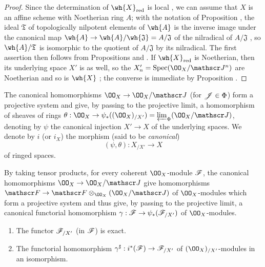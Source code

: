 \begin{proof}
\label{proof-1.10.8.6}
Since the determination of $\wh{X}_\red$ is local , we can assume that $X$ is an affine scheme with Noetherian ring $A$; with the notation of Proposition , the ideal $\mathfrak{T}$ of topologically nilpotent elements of $\wh{A}$ is the inverse image under the canonical map $\wh{A}\to\wh{A}/\wh{\mathfrak{J}}=A/\mathfrak{J}$ of the nilradical of $A/\mathfrak{J}$ , so $\wh{A}/\mathfrak{T}$ is isomorphic to the quotient of $A/\mathfrak{J}$ by its nilradical.
The first assertion then follows from Propositions  and .
If $\wh{X}_\red$ is Noetherian, then its underlying space $X'$ is as well, so the $X_n'=\Spec(\OO_X/\sh{J}^n)$ are Noetherian  and so is $\wh{X}$ ; the converse is immediate by Proposition .
\end{proof}

\begin{env}[10.8.7]
\label{1.10.8.7}
The canonical homomorphisms $\OO_X\to\OO_X/\sh{J}$ (for $\mathscr{J}\in\Phi$) form a projective system and give, by passing to the projective limit, a homomorphism of sheaves of rings $\theta:\OO_X\to\psi_*((\OO_X)_{/X'})=\varprojlim_\Phi(\OO_X/\sh{J})$, denoting by $\psi$ the canonical injection $X'\to X$ of the underlying spaces.
We denote by $i$ (or $i_X$) the morphism (said to be \emph{canonical})
\[
  (\psi,\theta):X_{/X'}\to X
\]
of ringed spaces.

By taking tensor products, for every coherent $\OO_X$-module $\mathscr{F}$, the canonical homomorphisms $\OO_X\to\OO_X/\sh{J}$ give homomorphisms $\sh{F}\to\sh{F}\otimes_{\OO_X}(\OO_X/\sh{J})$ of $\OO_X$-modules which form a projective system and thus give, by passing to the projective limit, a canonical functorial homomorphism $\gamma:\sh{F}\to\psi_*(\sh{F}_{/X'})$ of $\OO_X$-modules.
\end{env}

\begin{prop}[10.8.8]
\label{1.10.8.8}
\medskip\noindent
\begin{enumerate}[label=\emph{(\roman*)}]
  \item The functor $\mathscr{F}_{/X'}$ (in $\mathscr{F}$) is exact.
  \item The functorial homomorphism $\gamma^\sharp:i^*(\sh{F})\to\sh{F}_{/X'}$ of $(\OO_X)_{/X'}$-modules in an isomorphism.
\end{enumerate}
\end{prop}

